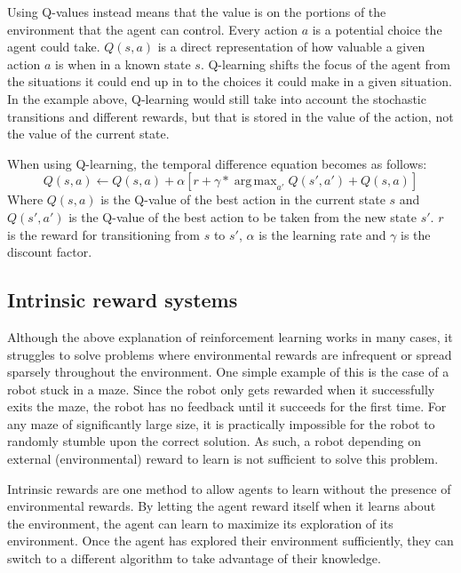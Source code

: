 \documentclass[12pt]{thesis}
\DeclareMathOperator*{\argmax}{arg\,max}
\begin{document}
Using Q-values instead means that the value is on the portions of the environment that the agent can control. Every action $a$ is a potential choice the agent could take. $Q(s,a)$ is a direct representation of how valuable a given action $a$ is when in a known state $s$. Q-learning shifts the focus of the agent from the situations it could end up in to the choices it could make in a given situation. In the example above, Q-learning would still take into account the stochastic transitions and different rewards, but that is stored in the value of the action, not the value of the current state.

When using Q-learning, the temporal difference equation becomes as follows:
\begin{equation}
	Q(s,a) \leftarrow Q(s,a) + \alpha [r + \gamma *  \argmax_{a'} Q(s',a') + Q(s,a)]
	\label{eq:TDQVF}
\end{equation}
Where $Q(s,a)$ is the Q-value of the best action in the current state $s$ and $Q(s',a')$ is the Q-value of the best action to be taken from the new state $s'$. $r$ is the reward for transitioning from $s$ to $s'$, $\alpha$ is the learning rate and $\gamma$ is the discount factor.\cite{Ladosz_2022}

\subsection{Intrinsic reward systems}
Although the above explanation of reinforcement learning works in many cases, it struggles to solve problems where environmental rewards are infrequent or spread sparsely throughout the environment. \cite{DBLP:journals/corr/abs-1908-06976}
\cite{FToCFaIM:Jurgen}
One simple example of this is the case of a robot stuck in a maze. Since the robot only gets rewarded when it successfully exits the maze, the robot has no feedback until it succeeds for the first time. For any maze of significantly large size, it is practically impossible for the robot to randomly stumble upon the correct solution. As such, a robot depending on external (environmental) reward to learn is not sufficient to solve this problem.

Intrinsic rewards are one method to allow agents to learn without the presence of environmental rewards. By letting the agent reward itself when it learns about the environment, the agent can learn to maximize its exploration of its environment. Once the agent has explored their environment sufficiently, they can switch to a different algorithm to take advantage of their knowledge. \cite{Rein:VIME}
\end{document}
